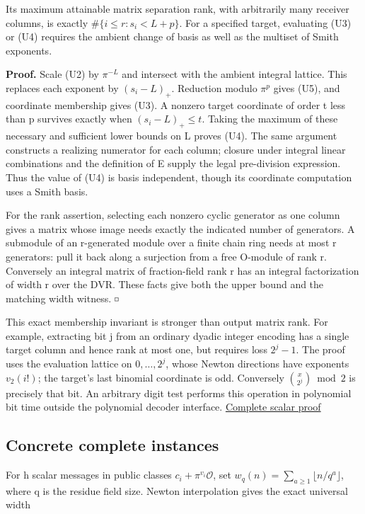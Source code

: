 \documentclass[11pt,a4paper]{article}
\renewcommand{\square}{\mathord{\vcenter{\hbox{\fboxsep=0pt\fboxrule=.4pt\fbox{\rule{0pt}{.7ex}\rule{.7ex}{0pt}}}}}}
\begin{document}
Its maximum attainable matrix separation rank, with arbitrarily many
receiver columns, is exactly \(\#\{i\le r:s_i<L+p\}\). For a specified
target, evaluating (U3) or (U4) requires the ambient change of basis as
well as the multiset of Smith exponents.

\textbf{Proof.} Scale (U2) by \(\pi^{-L}\) and intersect with the
ambient integral lattice. This replaces each exponent by \((s_i-L)_+\).
Reduction modulo \(\pi^p\) gives (U5), and coordinate membership gives
(U3). A nonzero target coordinate of order t less than p survives
exactly when \((s_i-L)_+\le t\). Taking the maximum of these necessary
and sufficient lower bounds on L proves (U4). The same argument
constructs a realizing numerator for each column; closure under integral
linear combinations and the definition of E supply the legal
pre-division expression. Thus the value of (U4) is basis independent,
though its coordinate computation uses a Smith basis.

For the rank assertion, selecting each nonzero cyclic generator as one
column gives a matrix whose image needs exactly the indicated number of
generators. A submodule of an r-generated module over a finite chain
ring needs at most r generators: pull it back along a surjection from a
free O-module of rank r. Conversely an integral matrix of fraction-field
rank r has an integral factorization of width r over the DVR. These
facts give both the upper bound and the matching width witness.
\(\square\)

This exact membership invariant is stronger than output matrix rank. For
example, extracting bit j from an ordinary dyadic integer encoding has a
single target column and hence rank at most one, but requires loss
\(2^j-1\). The proof uses the evaluation lattice on \(0,\ldots,2^j\),
whose Newton directions have exponents \(v_2(i!)\); the target's last
binomial coordinate is odd. Conversely \(\binom{x}{2^j}\bmod2\) is
precisely that bit. An arbitrary digit test performs this operation in
polynomial bit time outside the polynomial decoder interface.
\hyperref[v8-section-nonlinear-budget]{Complete scalar proof}

\subsection{Concrete complete
instances}\label{v8-concrete-complete-instances}

For h scalar messages in public classes \(c_i+\pi^{v_i}\mathcal O\), set
\(w_q(n)=\sum_{a\ge1}\lfloor n/q^a\rfloor\), where q is the residue
field size. Newton interpolation gives the exact universal width
\end{document}
